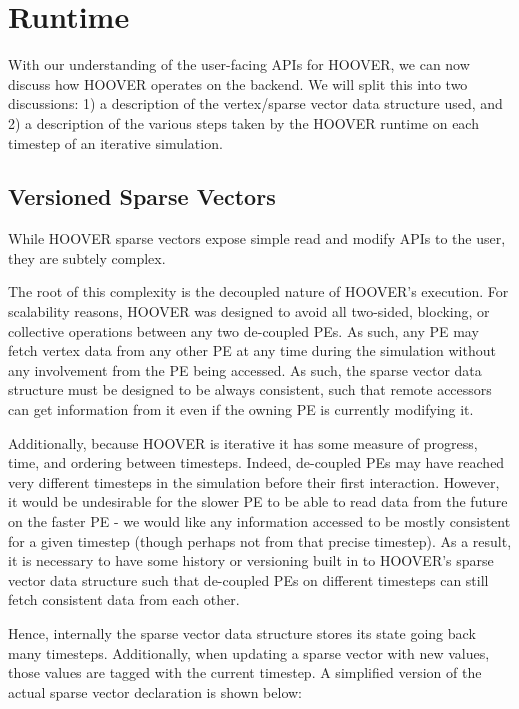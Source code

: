 \section{Runtime}

With our understanding of the user-facing APIs for HOOVER, we can now discuss
how HOOVER operates on the backend. We will split this into two discussions: 1)
a description of the vertex/sparse vector data structure used, and 2) a
description of the various steps taken by the HOOVER runtime on each timestep of
an iterative simulation.

\subsection{Versioned Sparse Vectors}

While HOOVER sparse vectors expose simple read and modify APIs to the user, they
are subtely complex.

The root of this complexity is the decoupled nature of HOOVER's execution. For
scalability reasons, HOOVER was designed to avoid all two-sided, blocking, or
collective operations between any two de-coupled PEs. As such, any PE may
fetch vertex data from any other PE at any time during the simulation without
any involvement from the PE being accessed. As such, the sparse vector data
structure must be designed to be always consistent, such that remote accessors
can get information from it even if the owning PE is currently modifying it.

Additionally, because HOOVER is iterative it has some measure of progress, time,
and ordering between timesteps. Indeed, de-coupled PEs may have
reached very different timesteps in the simulation before their first
interaction. However, it would be undesirable for the slower PE to be able to
read data from the future on the faster PE - we would like any information
accessed to be mostly consistent for a given timestep (though perhaps not from
that precise timestep). As a result, it is necessary to have some history or
versioning built in to HOOVER's sparse vector data structure such that
de-coupled PEs on different timesteps can still fetch consistent data from each
other.

Hence, internally the sparse vector data structure stores its state going back
many timesteps. Additionally, when updating a sparse vector with new values,
those values are tagged with the current timestep. A simplified version of the
actual sparse vector declaration is shown below:

